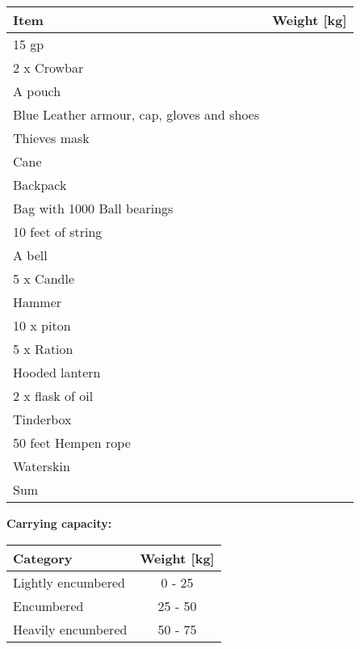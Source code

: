 \documentclass[11pt]{article}
\begin{document}
	\begin{tabularx}{\textwidth}{X|r}
Item & Weight [kg] \\
\hline
15 gp 										& 			\\
2 x Crowbar									& 		 	\\
A pouch										& 			\\
Blue Leather armour, cap, gloves and shoes	&			\\
Thieves mask								&			\\
Cane									 	& 			\\
Backpack									&	 	 	\\
Bag with 1000 Ball bearings					& 			\\
10 feet of string						 	&			\\
A bell									 	&			\\
5 x Candle								 	& 			\\
Hammer									 	& 			\\
10 x piton								 	& 			\\
5 x Ration									&	 	 	\\
Hooded lantern								& 			\\
2 x flask of oil						 	&			\\
Tinderbox								 	&			\\
50 feet Hempen rope						 	& 			\\
Waterskin								 	& 			\\

\hline
Sum 										& 
	\end{tabularx}

\vspace{10mm}

\textbf{Carrying capacity:} \\

	\begin{tabular}{l|c}
Category & Weight [kg] \\
\hline
Lightly encumbered 	& 0 - 25 	\\
Encumbered 			& 25 - 50 	\\
Heavily encumbered	& 50 - 75
	\end{tabular}
\end{document}
